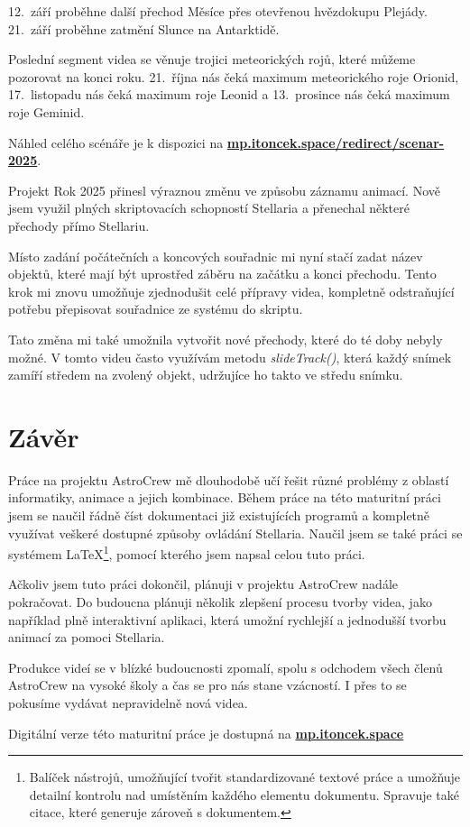 \documentclass[12pt,a4paper,titlepage]{article}
\newcommand{\link}[2]{\href{#1}{\textcolor{link-color}{\textbf{#2}}}}%
\begin{document}
12.\ září proběhne další přechod Měsíce přes otevřenou hvězdokupu Plejády. 21.\ září proběhne zatmění Slunce na Antarktidě.

Poslední segment videa se věnuje trojici meteorických rojů, které můžeme pozorovat na konci roku. 21.\ října nás čeká maximum meteorického roje Orionid, 17.\ listopadu nás čeká maximum roje Leonid a 13.\ prosince nás čeká maximum roje Geminid.

Náhled celého scénáře je k dispozici na \link{https://mp.itoncek.space/redirect/scenar-2025}{mp.itoncek.space/redirect/scenar-2025}.


Projekt Rok 2025 přinesl výraznou změnu ve způsobu záznamu animací. Nově jsem využil plných skriptovacích schopností Stellaria a přenechal některé přechody přímo Stellariu. 

Místo zadání počátečních a koncových souřadnic mi nyní stačí zadat název objektů, které mají být uprostřed záběru na začátku a konci přechodu. Tento krok mi znovu umožňuje zjednodušit celé přípravy videa, kompletně odstraňující potřebu přepisovat souřadnice ze systému do skriptu. 

Tato změna mi také umožnila vytvořit nové přechody, které do té doby nebyly možné. V tomto videu často využívám metodu \textit{slideTrack()}, která každý snímek zamíří středem na zvolený objekt, udržujíce ho takto ve středu snímku. %

\section{Závěr}
Práce na projektu AstroCrew mě dlouhodobě učí řešit různé problémy z oblastí informatiky, animace a jejich kombinace. Během práce na této maturitní práci jsem se naučil řádně číst dokumentaci již existujících programů a kompletně využívat veškeré dostupné způsoby ovládání Stellaria. Naučil jsem se také práci se systémem \LaTeX{}\footnote{Balíček nástrojů, umožňující tvořit standardizované textové práce a umožňuje detailní kontrolu nad umístěním každého elementu dokumentu. Spravuje také citace, které generuje zároveň s dokumentem.}, pomocí kterého jsem napsal celou tuto práci.

Ačkoliv jsem tuto práci dokončil, plánuji v projektu AstroCrew nadále pokračovat. Do budoucna plánuji několik zlepšení procesu tvorby videa, jako například plně interaktivní aplikaci, která umožní rychlejší a jednodušší tvorbu animací za pomoci Stellaria. 

Produkce videí se v blízké budoucnosti zpomalí, spolu s odchodem všech členů AstroCrew na vysoké školy a čas se pro nás stane vzácností. I přes to se pokusíme vydávat nepravidelně nová videa.

Digitální verze této maturitní práce je dostupná na \link{https://mp.itoncek.space}{mp.itoncek.space}
\end{document}
